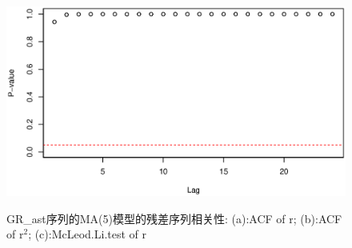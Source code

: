 \begin{figure}[h!]
\begin{minipage}[ht]{0.31\textwidth}
		\subcaption{}\label{acfr2}
	\end{minipage}
	\hspace{0.02\textwidth}
	\begin{minipage}[ht]{0.31\textwidth}
		\centering
		\includegraphics[width=1\textwidth]{pic/ast/mcr}
		\subcaption{}\label{mcr}
	\end{minipage}
	\caption{GR\_ast序列的MA(5)模型的残差序列相关性: (a):ACF of r; (b):ACF of r$^2$; (c):McLeod.Li.test of r}\label{testr}
\end{figure}

